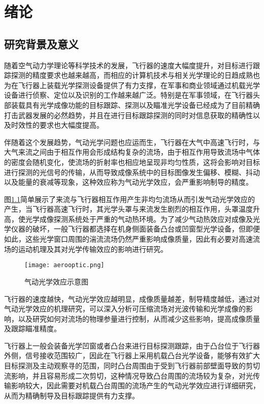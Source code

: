 \chapter{绪论}
\section{研究背景及意义}
随着空气动力学理论等科学技术的发展，飞行器的速度大幅度提升，对目标进行跟踪探测的精度要求也越来越高，而相应的计算机技术与相关光学理论的日趋成熟也为在飞行器上装载光学探测设备提供了有力支撑，在军事和商业领域通过机载光学设备进行侦察、定位以及识别的工作越来越广泛\cite{huang2008}。特别是在军事领域，在飞行器头部装载具有光学成像功能的目标跟踪、探测以及瞄准光学设备已经成为了目前精确打击武器发展的必然趋势，并且在进行目标跟踪探测的同时对信息获取的精确性以及时效性的要求也大幅度提高\cite{eric2006,shiyipeng2015}。

伴随着这个发展趋势，气动光学问题也应运而生，飞行器在大气中高速飞行时，与大气来流之间由于相互作用会形成结构复杂的流场\cite{busse2004}，由于相互作用导致流场中气体的密度会随机变化，使流场的折射率也相应地呈现非均匀性质，这将会影响对目标进行探测的光信号的传输，从而导致成像系统中的目标图像发生偏移、模糊、抖动以及能量的衰减等现象\cite{ejjumper2001}，这种效应称为气动光学效应，会严重影响制导的精度。

图\ref{fig:aero}简单展示了来流与飞行器相互作用产生非均匀流场从而引发气动光学效应的产生，当飞行器高速飞行时，其光学头罩与来流发生剧烈的相互作用，头罩温度升高，使光学成像探测系统处于严重的气动热环境。为了减少气动热效应对成像及光学仪器的破坏，一般飞行器都选择在机身侧面装备凸台或凹窗型光学设备，但即便如此，这些光学窗口周围的湍流流场仍然严重影响成像质量，因此有必要对高速流场的运动机理及其对光学传输效应的影响进行研究。
\begin{figure}[hbpt]
\centering
\texttt{[image: aerooptic.png]}
\caption{气动光学效应示意图}
\label{fig:aero}
\end{figure}

飞行器的速度越快，气动光学效应越明显，成像质量越差，制导精度越低，通过对气动光学效应的机理研究，可以深入分析可压缩流场对光波传输和光学成像的影响，以及研究如何对流场的物理参量进行控制，从而减少这些影响，提高成像质量及跟踪瞄准精度。

飞行器上一般会装备光学凹窗或者凸台来进行目标探测跟踪，由于凸台位于飞行器外侧，信号接收范围较广，因此在飞行器上采用机载凸台光学设备，能够有效扩大目标探测及主动观察寻的范围，同时凸台周围由于受到飞行器前部壁面导致的剪切流影响，并且容易形成二次剪切，这种情况导致凸台周围的流场较为复杂，对光传输影响较大，因此需要对机载凸台周围的流场产生的气动光学效应进行详细研究，从而为精确制导及目标跟踪提供有力支撑。

